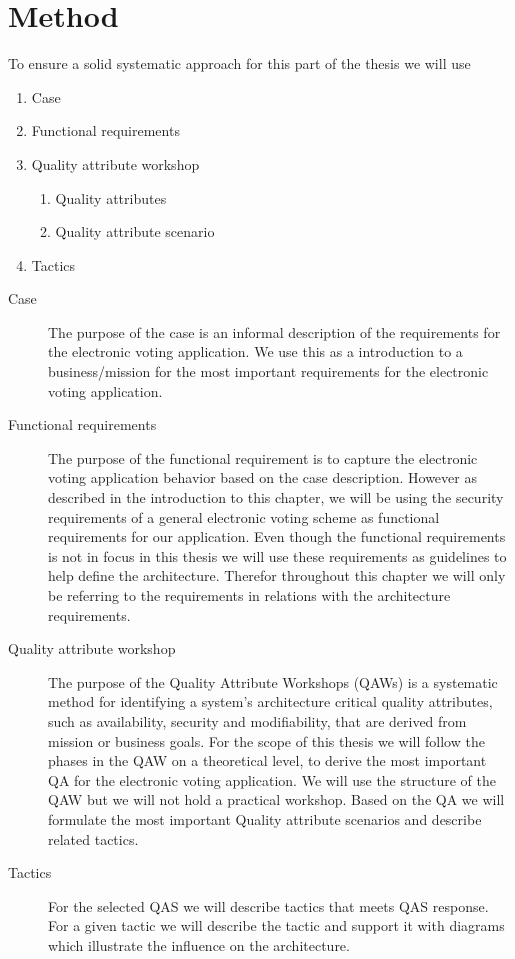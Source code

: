 \section{Method}
To ensure a solid systematic approach for this part of the thesis we will use


\begin{enumerate}
    \item Case
    \item Functional requirements
    \item Quality attribute workshop
        \begin{enumerate}
            \item Quality attributes
            \item Quality attribute scenario
        \end{enumerate}
    \item Tactics
\end{enumerate}


\begin{description}
    \item[Case] The purpose of the case is an informal description of the requirements for the electronic voting application. We use this as a introduction to a business/mission for the most important requirements for the electronic voting application.
    
    \item[Functional requirements]  The purpose of the functional requirement is to capture the electronic voting application behavior based on the case description. However as described in the introduction to this chapter, we will be using the security requirements of a general electronic voting scheme as functional requirements for our application.  Even though the functional requirements is not in focus in this thesis we will use these requirements as guidelines to help define the architecture. Therefor throughout this chapter we will only be referring to the requirements in relations with the architecture requirements. 
    
    \item[Quality attribute workshop]  The purpose of the Quality Attribute Workshops (QAWs) is a systematic method for identifying a system's architecture critical quality attributes, such as availability, security and modifiability, that are derived from mission or business goals. For the scope of this thesis we will follow the phases in the QAW on a theoretical level, to derive the most important QA for the electronic voting application. We will use the structure of the QAW but we will not hold a practical workshop.  Based on the QA we will formulate the most important Quality attribute scenarios and describe related tactics.
    
    \item [Tactics] For the selected QAS we will describe tactics that meets QAS response. For a given tactic we will describe the tactic and support it with diagrams which illustrate the influence on the architecture. 

\end{description}

